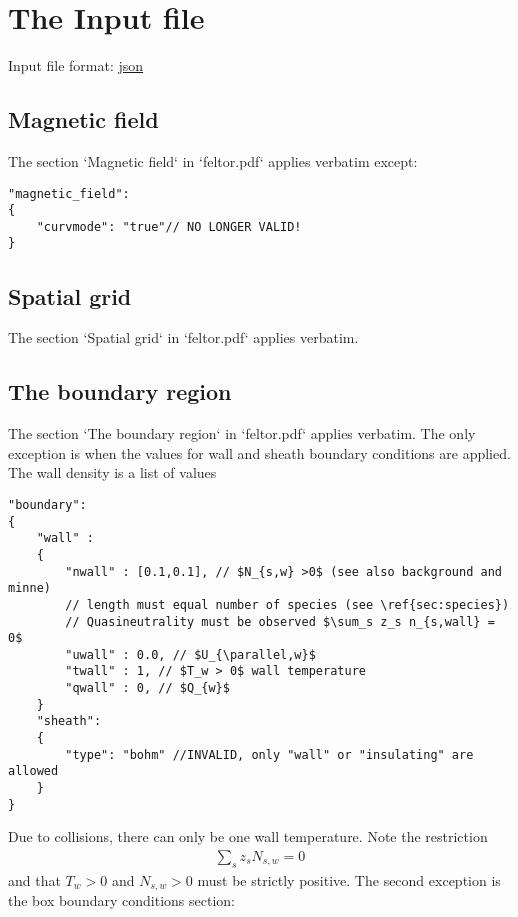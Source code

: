 \section{The Input file} \label{sec:input_file}
Input file format: \href{https://en.wikipedia.org/wiki/JSON}{json}

\subsection{Magnetic field} \label{sec:geometry_file}
The section `Magnetic field` in `feltor.pdf` applies verbatim except:

\begin{verbatim}
"magnetic_field":
{
    "curvmode": "true"// NO LONGER VALID!
}
\end{verbatim}

\subsection{Spatial grid} \label{sec:spatial}
The section `Spatial grid` in `feltor.pdf` applies verbatim.
\subsection{The boundary region} \label{sec:boundary}
The section `The boundary region` in `feltor.pdf` applies verbatim.
The only exception is when the values for wall and sheath boundary conditions are applied.
The wall density is a list of values
\begin{verbatim}
"boundary":
{
    "wall" :
    {
        "nwall" : [0.1,0.1], // $N_{s,w} >0$ (see also background and minne)
        // length must equal number of species (see \ref{sec:species})
        // Quasineutrality must be observed $\sum_s z_s n_{s,wall} = 0$
        "uwall" : 0.0, // $U_{\parallel,w}$
        "twall" : 1, // $T_w > 0$ wall temperature
        "qwall" : 0, // $Q_{w}$
    }
    "sheath":
    {
        "type": "bohm" //INVALID, only "wall" or "insulating" are allowed
    }
}
\end{verbatim}
Due to collisions, there can only be one wall temperature.
Note the restriction
\begin{align}
    \sum_s z_s N_{s,w} = 0
\end{align}
and that $T_{w}>0$ and $N_{s,w}>0$ must be strictly positive.
The second exception is the box boundary conditions section:
